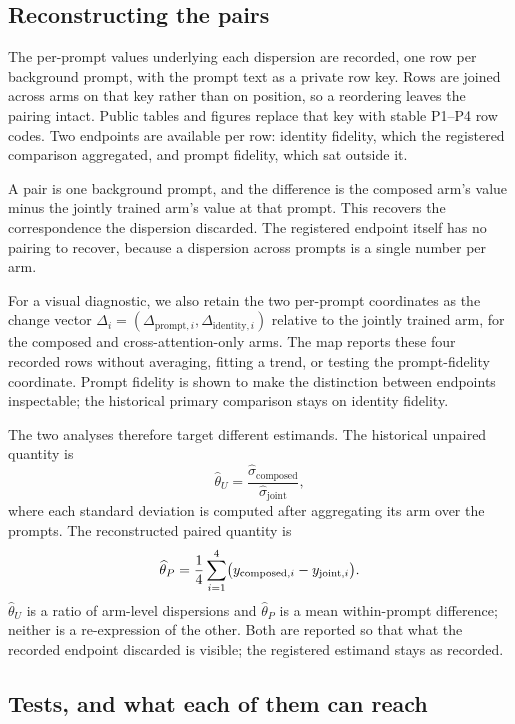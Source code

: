 \subsection{Reconstructing the pairs}

The per-prompt values underlying each dispersion are recorded, one row per
background prompt, with the prompt text as a private row key. Rows are joined
across arms on that key rather than on position, so a reordering leaves the
pairing intact. Public tables and figures replace that key with stable P1--P4
row codes. Two endpoints are available per row: identity fidelity, which the
registered comparison aggregated, and prompt fidelity, which sat outside it.

A pair is one background prompt, and the difference is the composed arm's value
minus the jointly trained arm's value at that prompt. This recovers the
correspondence the dispersion discarded. The registered endpoint itself has no
pairing to recover, because a dispersion across prompts is a single number per
arm.

For a visual diagnostic, we also retain the two per-prompt coordinates as
the change vector
\(\Delta_i=(\Delta_{\mathrm{prompt},i},\Delta_{\mathrm{identity},i})\)
relative to the jointly trained arm, for the composed and cross-attention-only
arms. The map reports these four recorded rows without averaging, fitting a
trend, or testing the prompt-fidelity coordinate. Prompt fidelity is shown to
make the distinction between endpoints inspectable; the historical primary
comparison stays on identity fidelity.

The two analyses therefore target different estimands. The historical
unpaired quantity is
\[
  \widehat{\theta}_{U}
  = \frac{\widehat{\sigma}_{\mathrm{composed}}}
          {\widehat{\sigma}_{\mathrm{joint}}},
\]
where each standard deviation is computed after aggregating its arm over the
\NPairs{} prompts. The reconstructed paired quantity is
\[
  \widehat{\theta}_{P}
  = \frac{1}{4{}}\sum_{i=1}^{4{}}
    \bigl(y_{\mathrm{composed},i}-y_{\mathrm{joint},i}\bigr).
\]
\(\widehat{\theta}_{U}\) is a ratio of arm-level dispersions and
\(\widehat{\theta}_{P}\) is a mean within-prompt difference; neither is a
re-expression of the other. Both are reported so that what the recorded
endpoint discarded is visible; the registered estimand stays as recorded.

\subsection{Tests, and what each of them can reach}

